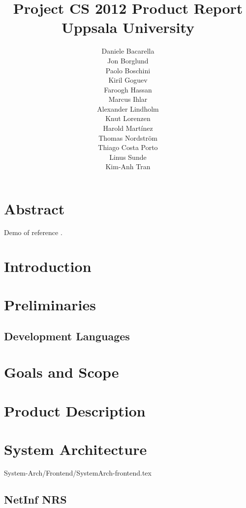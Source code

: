 \documentclass[11pt]{report}
\title{Project CS 2012 Product Report\\Uppsala University\\}
\author{Daniele Bacarella\\
		Jon Borglund\\
		Paolo Boschini\\
		Kiril Goguev\\
		Faroogh Hassan\\
		Marcus Ihlar\\
		Alexander Lindholm\\
		Knut Lorenzen\\
		Harold Mart\'{i}nez\\
		Thomas Nordstr\"om\\
		Thiago Costa Porto\\
		Linus Sunde\\
		Kim-Anh Tran
}
\date{}
\begin{document}
\maketitle

\tableofcontents

\chapter{Abstract}

Demo of reference \cite{b1}. 
\chapter{Introduction}


\chapter{Preliminaries}

\section{Development Languages}


\chapter{Goals and Scope}


\chapter{Product Description}





\chapter{System Architecture}

 {System-Arch/Frontend/SystemArch-frontend.tex}

\section {NetInf NRS}


\end{document}
